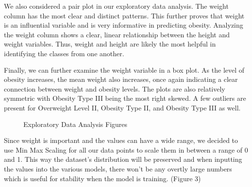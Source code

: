 \documentclass[11pt]{article}
\begin{document}
    
    We also considered a pair plot in our exploratory data analysis. The weight column has the most clear and distinct patterns. This further proves that weight is an influential variable and is very informative in predicting obesity. Analyzing the weight column shows a clear, linear relationship between the height and weight variables. Thus, weight and height are likely the most helpful in identifying the classes from one another. 
    
    Finally, we can further examine the weight variable in a box plot. As the level of obesity increases, the mean weight also increases, once again indicating a clear connection between weight and obesity levels. The plots are also relatively symmetric with Obesity Type III being the most right skewed. A few outliers are present for Overweight Level II, Obesity Type II, and Obesity Type III as well.
   \begin{figure}[h]
      \centering
      \hfill
      \caption{Exploratory Data Analysis Figures}
    \end{figure}
    Since weight is important and the values can have a wide range, we decided to use Min Max Scaling for all our data points to scale them in between a range of 0 and 1. This way the dataset's distribution will be preserved and when inputting the values into the various models, there won't be any overtly large numbers which is useful for stability when the model is training. (Figure 3)
\end{document}
